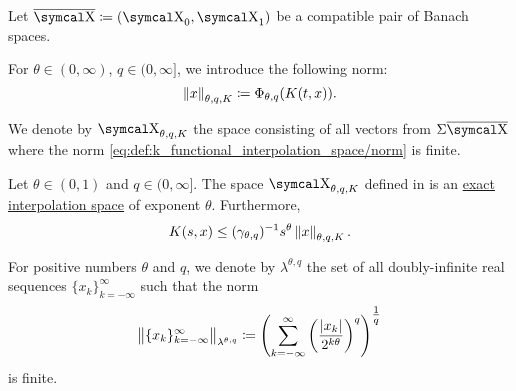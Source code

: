 \begin{definition}\label{def:k_functional_interpolation_space}
  Let \( \Ol{\CX} \coloneqq ( \CX_0, \CX_1 ) \) be a compatible pair of Banach spaces.

  For \( \theta \in (0, \infty) \), \( q \in (0, \infty] \), we introduce the following norm:
  \begin{equation}\label{eq:def:k_functional_interpolation_space/norm}
    \left\Vert x \right\Vert_{\theta,q,K} \coloneqq \Phi_{\theta,q}(K(t, x)).
  \end{equation}

  We denote by \( \CX_{\theta,q,K} \) the space consisting of all vectors from \( \Sigma \Ol{\CX} \) where the norm \eqref{eq:def:k_functional_interpolation_space/norm} is finite.
\end{definition}

\begin{theorem}\label{thm:k_functional_interpolation}
  Let \( \theta \in (0, 1) \) and \( q \in (0, \infty] \). The space \( \CX_{\theta,q,K} \) defined in  is an \hyperref[thm:banach_interpolation_space_exponent]{exact interpolation space} of exponent \( \theta \). Furthermore,
  \begin{equation*}
    K(s, x) \leq (\gamma_{\theta,q})^{-1} s^\theta \left\Vert x \right\Vert_{\theta,q,K}.
  \end{equation*}
\end{theorem}

\begin{definition}\label{def:discrete_k_interpolation_space}
  For positive numbers \( \theta \) and \( q \), we denote by \( \lambda^{\theta,q} \) the set of all doubly-infinite real sequences \( \{ x_k \}_{k=-\infty}^\infty \) such that the norm
  \begin{equation}\label{def:discrete_k_interpolation_space}
    \left\Vert \{ x_k \}_{k=-\infty}^\infty \right\Vert_{\lambda^{\theta,q}} \coloneqq \left( \sum_{k=-\infty}^\infty \left( \frac {\left\vert x_k \right\vert} {2^{k\theta}} \right)^q \right)^{\tfrac 1 q}
  \end{equation}
  is finite.
\end{definition}

